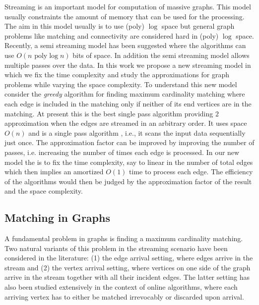 \documentclass{scrartcl}
\begin{document}
Streaming is an important model for computation of massive graphs. This model usually constraints the amount of memory that can be used for the processing. The aim in this model usually is to use (poly) $\log$ space but general graph problems like matching and connectivity are considered hard in (poly) $\log$ space. Recently, a semi streaming model has been suggested where the algorithms can use $O(n \text{ poly} \log n)$ bits of space. In addition the semi streaming model allows multiple passes over the data.  In this work we propose a new streaming model in which we fix the time complexity and study the approximations for graph problems while varying the space complexity. 
To understand this new model consider the \emph{greedy} algorithm for finding maximum cardinality matching where each edge is included in the matching only if neither of its end vertices are in the matching. At present this is the best single pass algorithm providing $2$ approximation when the edges are streamed in an arbitrary order. It uses space $O(n)$ and is a single pass algorithm , i.e., it scans the input data sequentially just once. The approximation factor can be improved by improving the number of passes, i.e. increasing the number of times each edge is processed. In our new model the is to fix the time complexity, say to linear in the number of total edges which then implies an amortized $O(1)$ time to process each edge. The efficiency of the algorithms would then be judged by the approximation factor of the result and the space complexity.  



%
%
%
\subsection{Matching in Graphs}
A fundamental problem in graphs is finding a maximum cardinality matching. 
Two natural variants of this problem in the streaming scenario have been considered in the literature: (1) the edge
arrival setting, where edges arrive in the stream and (2) the vertex arrival setting, where vertices on one
side of the graph arrive in the stream together with all their incident edges.
The latter setting has also
been studied extensively in the context of online algorithms, where each arriving vertex has to either be
matched irrevocably or discarded upon arrival.
\end{document}
